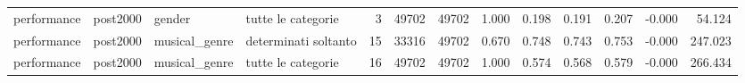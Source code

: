 \begin{table}
\begin{tabular}{llllrrrrrrrrr}
performance & post2000 &        gender &   tutte le categorie &            3 &        49702 &         49702 &              1.000 & 0.198 &  0.191 &  0.207 &  -0.000 &  54.124 \\
performance & post2000 & musical\_genre & determinati soltanto &           15 &        33316 &         49702 &              0.670 & 0.748 &  0.743 &  0.753 &  -0.000 & 247.023 \\
performance & post2000 & musical\_genre &   tutte le categorie &           16 &        49702 &         49702 &              1.000 & 0.574 &  0.568 &  0.579 &  -0.000 & 266.434 \\
\bottomrule
\end{tabular}
\end{table}
